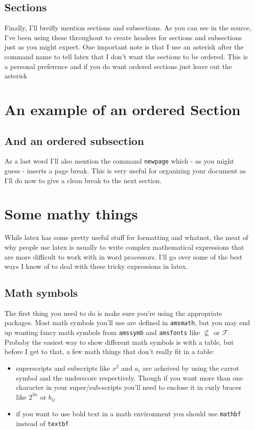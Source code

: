 \documentclass{article}
\begin{document}
\subsection*{Sections}
Finally, I'll breifly mention sections and subsections. As you can see in the
source, I've been using these throughout to create headers for sections and
subsections just as you might expect. One important note is that I use an
asterisk after the command name to tell latex that I don't want the sections
to be ordered. This is a personal preference and if you do want ordered
sections just leave out the asterisk

\section{An example of an ordered Section}
\subsection{And an ordered subsection}

As a last word I'll also mention the command \lstinline{newpage} which - as
you might guess - inserts a page break. This is very useful for organizing your
document as I'll do now to give a clean break to the next section.

\newpage
\section*{Some mathy things}
While latex has some pretty useful stuff for formatting and whatnot, the meat
of why people use latex is usually to write complex mathematical expressions
that are more difficult to work with in word processors. I'll go over some of
the best ways I know of to deal with these tricky expressions in latex.

\subsection*{Math symbols}
The first thing you need to do is make sure you're using the appropriate
packages. Most math symbols you'll use are defined in \lstinline{amsmath},
but you may end up wanting fancy math symbols from \lstinline{amssymb} and
\lstinline{amsfonts} like $\not\subseteq$ or $\mathcal{F}.$~\\

Probaby the easiest way to show different math symbols is with a table, but
before I get to that, a few math things that don't really fit in a table:
\begin{itemize}
\item superscripts and subscripts like $x^2$ and $a_i$ are acheived by using
      the carrot symbol and the underscore respectively. Though if you want
      more than one character in your super/sub-scripts you'll need to enclose
      it in curly braces like $2^{3n}$ or $b_{ij}$

\item if you want to use bold text in a math environment you should use
      \lstinline{mathbf} instead of \lstinline{textbf}
\end{itemize}
\end{document}
